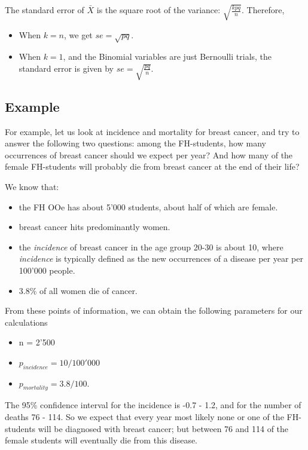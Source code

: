 The standard error of $\bar{X}$ is the square root of the variance: $\sqrt {\frac{kpq}{n}}$. Therefore,

\begin{itemize}
  \item When $k=n$, we get $se = \sqrt {pq}$.
  \item When $k=1$, and the Binomial variables are just Bernoulli trials, the standard error is given by $se = \sqrt {\frac{pq}{n}}$.
\end{itemize}


\subsection{Example}

For example, let us look at incidence and mortality for breast cancer, and try to answer the following two questions: among the FH-students, how many occurrences of breast cancer should we expect per year? And how many of the female FH-students will probably die from breast cancer at the end of their life?

We know that:

\begin{itemize}
  \item the FH OOe has about 5'000 students, about half of which are female.
  \item breast cancer hits predominantly women.
  \item the \emph{incidence} of breast cancer in the age group 20-30 is about 10, where \emph{incidence} is typically defined as the new occurrences of a disease per year per 100'000 people.
  \item 3.8\% of all women die of cancer.
\end{itemize}

From these points of information, we can obtain the following parameters for our calculations

\begin{itemize}
  \item n = 2'500
  \item $p_{incidence} = 10 / 100'000$
  \item $p_{mortality} = 3.8/100$.
\end{itemize}

The 95\% confidence interval for the incidence is -0.7 - 1.2, and for the number of deaths 76 - 114. So we expect that every year most likely none or one of the FH-students will be diagnosed with breast cancer; but between 76 and 114 of the female students will eventually die from this disease.


